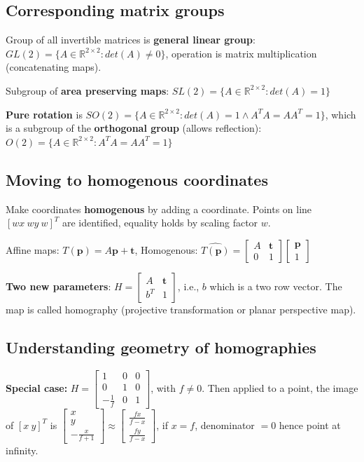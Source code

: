 \subsection{Corresponding matrix groups}

Group of all invertible matrices is \textbf{general linear group}: $GL(2) = \{A \in \mathbb{R}^{2\times 2} : det(A) \neq 0\}$, operation is matrix multiplication (concatenating maps).

Subgroup of \textbf{area preserving maps}:  $SL(2) = \{A \in \mathbb{R}^{2\times 2} : det(A) = 1\}$

\textbf{Pure rotation} is  $SO(2) = \{A \in \mathbb{R}^{2\times 2} : det(A) = 1 \wedge A^T A = AA^T = 1\}$, which is a subgroup of the \textbf{orthogonal group} (allows reflection): $O(2) = \{A \in \mathbb{R}^{2\times 2} : A^T A = AA^T = 1\}$

\subsection{Moving to homogenous coordinates}

Make coordinates \textbf{homogenous} by adding a coordinate. Points on line $[wx \ wy \ w]^T$ are identified, equality holds by scaling factor $w$.

Affine maps: $T(\mathbf{p}) = A \mathbf{p} + \mathbf{t}$, Homogenous: $\widehat{T(\mathbf{p})} = \left[\begin{matrix}
    A & \mathbf{t} \\
    0 & 1
\end{matrix}\right]\left[\begin{matrix}
    \mathbf{p}\\
    1
\end{matrix}\right]$

\textbf{Two new parameters}: $H = \left[\begin{matrix}
    A & \mathbf{t} \\
    b^T & 1
\end{matrix}\right]$, i.e., $b$ which is a two row vector. The map is called homography (projective transformation or planar perspective map).

\subsection{Understanding geometry of homographies}

\textbf{Special case:} $H = \left[\begin{matrix}
1 & 0 & 0 \\ 0 & 1 & 0 \\ -\frac{1}{f} & 0 & 1 
\end{matrix}\right]$, with $f \neq 0$. Then applied to a point, the image of $[x \ y]^T$ is $\left[ \begin{matrix}x \\ y \\ -\frac{x}{f+1}\end{matrix} \right] \approx
\left[ \begin{matrix}\frac{fx}{f-x} \\ \frac{fy}{f-x}\end{matrix} \right]$, if $x = f$, denominator $= 0$ hence point at infinity.

